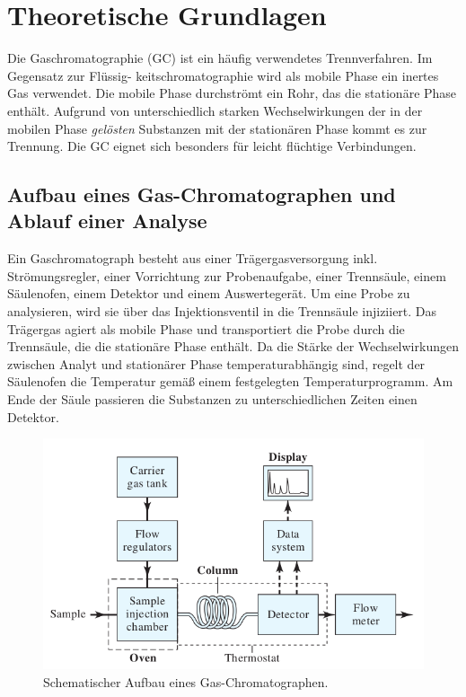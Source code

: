 \section{Theoretische Grundlagen}
  
  Die Gaschromatographie (GC) ist ein häufig verwendetes Trennverfahren. Im Gegensatz zur Flüssig- keitschromatographie wird als mobile Phase ein inertes Gas verwendet. Die mobile Phase durchströmt ein Rohr, das die stationäre Phase enthält. Aufgrund von unterschiedlich starken Wechselwirkungen der in der mobilen Phase \textit{gelösten} Substanzen mit der stationären Phase kommt es zur Trennung. Die GC eignet sich besonders für leicht flüchtige Verbindungen. \citep[S. 164, 165]{Taschenatlas}
  
  \subsection{Aufbau eines Gas-Chromatographen und Ablauf einer Analyse}
    
    Ein Gaschromatograph besteht aus einer Trägergasversorgung inkl. Strömungsregler,  einer Vorrichtung zur Probenaufgabe, einer Trennsäule, einem Säulenofen, einem Detektor und einem Auswertegerät. Um eine Probe zu analysieren, wird sie über das Injektionsventil in die Trennsäule injiziiert. Das Trägergas agiert als mobile Phase und transportiert die Probe durch die Trennsäule, die die stationäre Phase enthält. Da die Stärke der Wechselwirkungen zwischen Analyt und stationärer Phase temperaturabhängig sind, regelt der Säulenofen die Temperatur gemäß einem festgelegten Temperaturprogramm. Am Ende der Säule passieren die Substanzen zu unterschiedlichen Zeiten einen Detektor. \citep[S. 164, 165]{Taschenatlas}
    
      \begin{figure}[H]
        \includegraphics[scale=0.35, center]{images/GCApparat.png} 
        \caption[Schematischer Aufbau eines GC, Quelle: \citep{InstrumentelleAnalytikSkoog}]{Schematischer Aufbau eines Gas-Chromatographen.}
        \label{fig:AufbauHPLC}
      \end{figure}
    
